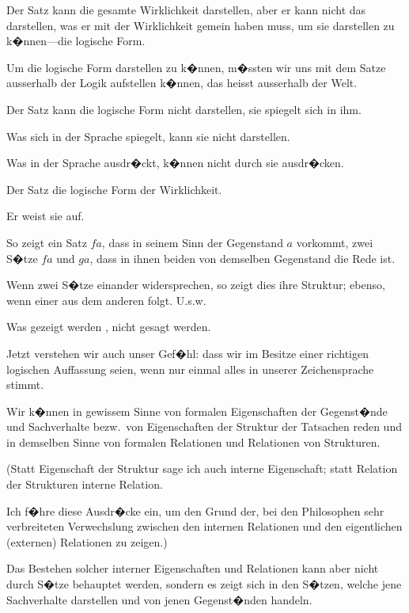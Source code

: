\begin{propositions}
{Der Satz kann die gesamte Wirklichkeit darstellen,
aber er kann nicht das darstellen, was er
mit der Wirklichkeit gemein haben muss, um sie
darstellen zu k�nnen---die logische Form.

Um die logische Form darstellen zu k�nnen,
m�ssten wir uns mit dem Satze ausserhalb der
Logik aufstellen k�nnen, das heisst ausserhalb der
Welt.}


{Der Satz kann die logische Form nicht darstellen,
sie spiegelt sich in ihm.

Was sich in der Sprache spiegelt, kann sie
nicht darstellen.

Was  in der Sprache ausdr�ckt, k�nnen
 nicht durch sie ausdr�cken.

Der Satz  die logische Form der Wirklichkeit.

Er weist sie auf.}


{So zeigt ein Satz \glqq{}$fa$\grqq{}, dass in seinem Sinn der
Gegenstand $a$ vorkommt, zwei S�tze \glqq{}$fa$\grqq{} und \glqq{}$ga$\grqq{},
dass in ihnen beiden von demselben Gegenstand
die Rede ist.

Wenn zwei S�tze einander widersprechen, so
zeigt dies ihre Struktur; ebenso, wenn einer aus
dem anderen folgt. U.s.w.}


{Was gezeigt werden ,  nicht gesagt
werden.}


{Jetzt verstehen wir auch unser Gef�hl: dass wir
im Besitze einer richtigen logischen Auffassung
seien, wenn nur einmal alles in unserer Zeichensprache
stimmt.}


{{\stretchyspace
Wir k�nnen in gewissem Sinne von formalen
Eigenschaften der Gegenst�nde und Sachverhalte
bezw.\ von Eigenschaften der Struktur der Tatsachen
reden und in demselben Sinne von formalen
Relationen und Relationen von Strukturen.}

(Statt Eigenschaft der Struktur sage ich auch
\glqq{}interne Eigenschaft\grqq{}; statt Relation der Strukturen
\glqq{}interne Relation\grqq{}.

Ich f�hre diese Ausdr�cke ein, um den Grund
der, bei den Philosophen sehr verbreiteten Verwechslung
zwischen den internen Relationen und
den eigentlichen (externen) Relationen zu zeigen.)

Das Bestehen solcher interner Eigenschaften
und Relationen kann aber nicht durch S�tze
behauptet werden, sondern es zeigt sich in den
S�tzen, welche jene Sachverhalte darstellen und
von jenen Gegenst�nden handeln.}



\end{propositions}
